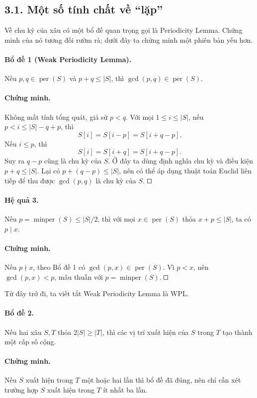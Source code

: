 \documentclass[11pt]{article}
\newcommand{\square}{\mathord{\vcenter{\hrule height .5pt
  \hbox{\vrule width .5pt height 5pt\kern5pt\vrule width .5pt}
  \hrule height .5pt}}}
\begin{document}
\subsection*{3.1. Một số tính chất về ``lặp''}

Về chu kỳ của xâu có một bổ đề quan trọng gọi là Periodicity Lemma. Chứng minh
của nó tương đối rườm rà; dưới đây ta chứng minh một phiên bản yếu hơn.

\paragraph{Bổ đề 1 (Weak Periodicity Lemma).}
Nếu \(p,q\in\operatorname{per}(S)\) và \(p+q\le |S|\), thì
\(\gcd(p,q)\in\operatorname{per}(S)\).

\paragraph{Chứng minh.}
Không mất tính tổng quát, giả sử \(p<q\). Với mọi \(1\le i\le |S|\), nếu
\(p<i\le |S|-q+p\), thì
\[
  S[i]=S[i-p]=S[i+q-p].
\]
Nếu \(i\le p\), thì
\[
  S[i]=S[i+q]=S[i+q-p].
\]
Suy ra \(q-p\) cũng là chu kỳ của \(S\). Ở đây ta dùng định nghĩa chu kỳ và
điều kiện \(p+q\le |S|\). Lại có \(p+(q-p)\le |S|\), nên có thể áp dụng thuật
toán Euclid liên tiếp để thu được \(\gcd(p,q)\) là chu kỳ của \(S\). \(\square\)

\paragraph{Hệ quả 3.}
Nếu \(p=\operatorname{minper}(S)\le |S|/2\), thì với mọi
\(x\in\operatorname{per}(S)\) thỏa \(x+p\le |S|\), ta có \(p\mid x\).

\paragraph{Chứng minh.}
Nếu \(p\nmid x\), theo Bổ đề 1 có \(\gcd(p,x)\in\operatorname{per}(S)\). Vì
\(p<x\), nên \(\gcd(p,x)<p\), mâu thuẫn với
\(p=\operatorname{minper}(S)\). \(\square\)

Từ đây trở đi, ta viết tắt Weak Periodicity Lemma là WPL.

\paragraph{Bổ đề 2.}
Nếu hai xâu \(S,T\) thỏa \(2|S|\ge |T|\), thì các vị trí xuất hiện của \(S\)
trong \(T\) tạo thành một cấp số cộng.

\paragraph{Chứng minh.}
Nếu \(S\) xuất hiện trong \(T\) một hoặc hai lần thì bổ đề đã đúng, nên chỉ cần
xét trường hợp \(S\) xuất hiện trong \(T\) ít nhất ba lần.
\end{document}
